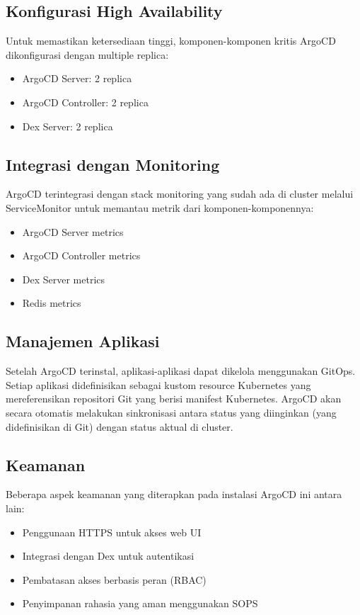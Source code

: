 \subsection{Konfigurasi High Availability}
Untuk memastikan ketersediaan tinggi, komponen-komponen kritis ArgoCD dikonfigurasi dengan multiple replica:

\begin{itemize}
  \item ArgoCD Server: 2 replica
  \item ArgoCD Controller: 2 replica
  \item Dex Server: 2 replica
\end{itemize}

\subsection{Integrasi dengan Monitoring}
ArgoCD terintegrasi dengan stack monitoring yang sudah ada di cluster melalui ServiceMonitor untuk memantau metrik dari komponen-komponennya:

\begin{itemize}
  \item ArgoCD Server metrics
  \item ArgoCD Controller metrics
  \item Dex Server metrics
  \item Redis metrics
\end{itemize}

\subsection{Manajemen Aplikasi}
Setelah ArgoCD terinstal, aplikasi-aplikasi dapat dikelola menggunakan GitOps. Setiap aplikasi didefinisikan sebagai kustom resource Kubernetes yang mereferensikan repositori Git yang berisi manifest Kubernetes. ArgoCD akan secara otomatis melakukan sinkronisasi antara status yang diinginkan (yang didefinisikan di Git) dengan status aktual di cluster.

\subsection{Keamanan}
Beberapa aspek keamanan yang diterapkan pada instalasi ArgoCD ini antara lain:

\begin{itemize}
  \item Penggunaan HTTPS untuk akses web UI
  \item Integrasi dengan Dex untuk autentikasi
  \item Pembatasan akses berbasis peran (RBAC)
  \item Penyimpanan rahasia yang aman menggunakan SOPS
\end{itemize}

